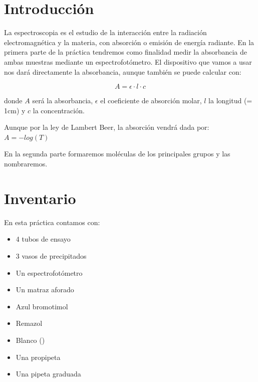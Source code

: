 \section{Introducción}
\noindent La espectroscopia es el estudio de la interacción entre la radiación electromagnética y la materia, con absorción o emisión de energía radiante. En la primera parte de la práctica tendremos como finalidad medir la absorbancia de ambas muestras mediante un espectrofotómetro. El dispositivo que vamos a usar nos dará directamente la absorbancia, aunque también se puede calcular con:

\[A = \epsilon\cdot{l}\cdot{c}\]

\vspace{0.2cm}

\noindent donde $A$ será la absorbancia, $\epsilon$ el coeficiente de absorción molar, $l$ la longitud (= 1cm) y $c$ la concentración.

\noindent Aunque por la ley de Lambert Beer, la absorción vendrá dada por: $A = -log(T)$

\vspace{0.1cm}


\noindent En la segunda parte formaremos moléculas de los principales grupos y las nombraremos.

\section{Inventario}
\noindent En esta práctica contamos con:

\begin{multicols}{2}
    \begin{itemize}
        \item 4 tubos de ensayo
        \item 3 vasos de precipitados
        \item Un espectrofotómetro
        \item Un matraz aforado
        \item Azul bromotimol
        \item Remazol
        \item Blanco ()
        \item Una propipeta
        \item Una pipeta graduada
    \end{itemize}
\end{multicols}

